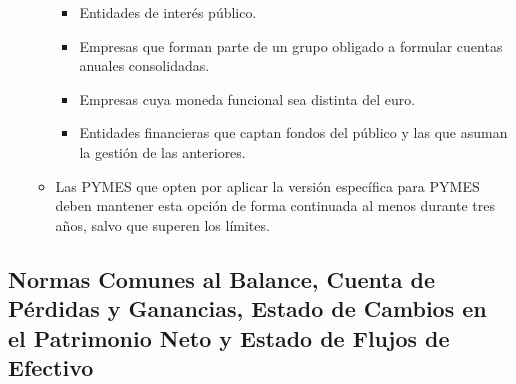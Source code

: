 \documentclass[
  paper=a4,
  ,captions=tableheading
]{scrbook}
\providecommand{\tightlist}{%
  \setlength{\itemsep}{0pt}\setlength{\parskip}{0pt}}
\begin{document}
\begin{itemize}
\begin{itemize}
    \begin{itemize}
    \tightlist
    \item
      Entidades de interés público.
    \item
      Empresas que forman parte de un grupo obligado a formular cuentas
      anuales consolidadas.
    \item
      Empresas cuya moneda funcional sea distinta del euro.
    \item
      Entidades financieras que captan fondos del público y las que
      asuman la gestión de las anteriores.
    \end{itemize}
  \item
    Las PYMES que opten por aplicar la versión específica para PYMES
    deben mantener esta opción de forma continuada al menos durante tres
    años, salvo que superen los límites.
  \end{itemize}
\end{itemize}

\hypertarget{normas-comunes-al-balance-cuenta-de-puxe9rdidas-y-ganancias-estado-de-cambios-en-el-patrimonio-neto-y-estado-de-flujos-de-efectivo}{%
\subsection{Normas Comunes al Balance, Cuenta de Pérdidas y Ganancias,
Estado de Cambios en el Patrimonio Neto y Estado de Flujos de
Efectivo}\label{normas-comunes-al-balance-cuenta-de-puxe9rdidas-y-ganancias-estado-de-cambios-en-el-patrimonio-neto-y-estado-de-flujos-de-efectivo}}
\end{document}
